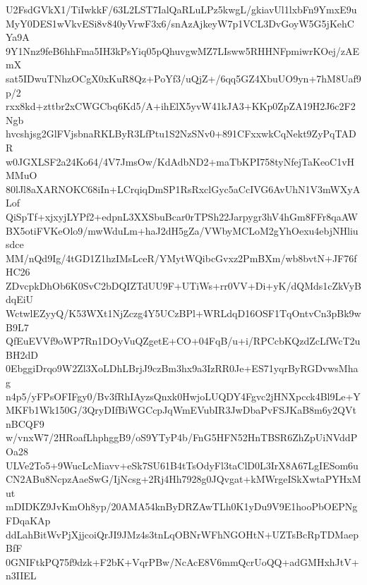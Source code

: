 U2FsdGVkX1/TiIwkkF/63L2LST7IalQaRLuLPz5kwgL/gkiavUl1lxbFn9YmxE9u
MyY0DES1wVkvESi8v840yVrwF3x6/snAzAjkeyW7p1VCL3DvGoyW5G5jKehCYa9A
9Y1Nnz9feB6hhFma5IH3kPsYiq05pQhuvgwMZ7LIsww5RHHNFpmiwrKOej/zAEmX
sat5IDwuTNhzOCgX0xKuR8Qz+PoYf3/uQjZ+/6qq5GZ4XbuUO9yn+7hM8Uaf9p/2
rxx8kd+zttbr2xCWGCbq6Kd5/A+ihElX5yvW41kJA3+KKp0ZpZA19H2J6c2F2Ngb
hvcshjsg2GlFVjsbnaRKLByR3LfPtu1S2NzSNv0+891CFxxwkCqNekt9ZyPqTADR
w0JGXLSF2a24Ko64/4V7JmsOw/KdAdbND2+maTbKPI758tyNfejTaKeoC1vHMMuO
80lJl8aXARNOKC68iIn+LCrqiqDmSP1RsRxclGyc5aCcIVG6AvUhN1V3mWXyALof
QiSpTf+xjxyjLYPf2+edpnL3XXSbuBcar0rTPSh22Jarpygr3hV4hGm8FFr8qaAW
BX5otiFVKeOlo9/mwWduLm+haJ2dH5gZa/VWbyMCLoM2gYhOexu4ebjNHliusdce
MM/nQd9Ig/4tGD1Z1hzIMsLceR/YMytWQibcGvxz2PmBXm/wb8bvtN+JF76fHC26
ZDvcpkDhOb6K0SvC2bDQIZTdUU9F+UTiWs+rr0VV+Di+yK/dQMds1cZkVyBdqEiU
WctwlEZyyQ/K53WXt1NjZczg4Y5UCzBPl+WRLdqD16OSF1TqOntvCn3pBk9wB9L7
QfEuEVVf9oWP7Rn1DOyVuQZgetE+CO+04FqB/u+i/RPCcbKQzdZcLfWcT2uBH2dD
0EbggiDrqo9W2Zl3XoLDhLBrjJ9czBm3hx9a3IzRR0Je+ES71yqrByRGDvwsMhag
n4p5/yFPsOFIFgy0/Bv3fRhIAyzsQnxk0HwjoLUQDY4Fgvc2jHNXpcck4Bl9Le+Y
MKFb1Wk150G/3QryDIfBiWGCcpJqWmEVubIR3JwDbaPvFSJKaB8m6y2QVtnBCQF9
w/vnxW7/2HRoafLhphggB9/oS9YTyP4b/FnG5HFN52HnTBSR6ZhZpUiNVddPOa28
ULVe2To5+9WucLcMiavv+eSk7SU61B4tTsOdyFl3taClD0L3IrX8A67LgIESom6u
CN2ABu8NcpzAaeSwG/IjNcsg+2Rj4Hh7928g0JQvgat+kMWrgeISkXwtaPYHxMut
mDIDKZ9JvKmOh8yp/20AMA54knByDRZAwTLh0K1yDu9V9E1hooPbOEPNgFDqaKAp
ddLahBitWvPjXjjcoiQrJI9JMz4s3tnLqOBNrWFhNGOHtN+UZTsBcRpTDMaepBfF
0GNIFtkPQ75f9dzk+F2bK+VqrPBw/NcAcE8V6mmQcrUoQQ+adGMHxhJtV+n3IIEL
